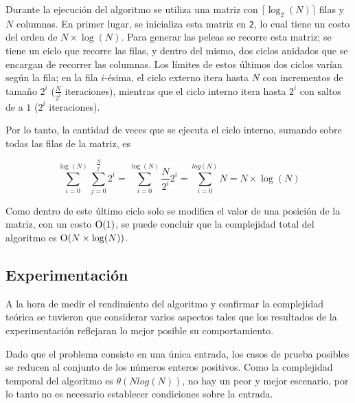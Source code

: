      Durante la ejecución del algoritmo se utiliza una matriz con $\lceil \log_2(N) \rceil$ filas y $N$ columnas. En primer lugar, se inicializa esta matriz en \texttt{2}, lo cual tiene un costo del orden de $N \times \log(N)$. Para generar las peleas se recorre esta matriz; se tiene un ciclo que recorre las filas, y dentro del mismo, dos ciclos anidados que se encargan de recorrer las columnas. Los límites de estos últimos dos ciclos varían según la fila; en la fila $i$-ésima, el ciclo externo itera hasta $N$ con incrementos de tamaño $2^i$ ($\frac{N}{2^i}$ iteraciones), mientras que el ciclo interno itera hasta $2^i$ con saltos de a $1$ ($2^i$ iteraciones).

      Por lo tanto, la cantidad de veces que se ejecuta el ciclo interno, sumando sobre todas las filas de la matriz, es

      \[\sum_{i = 0}^{\log(N)} \sum_{j = 0}^{\frac{N}{2^i}} 2^i = \sum_{i = 0}^{\log(N)} \frac{N}{2^i} 2^i = \sum_{i = 0}^{log(N)} N = N \times \log(N)\]

      Como dentro de este último ciclo solo se modifica el valor de una posición de la matriz, con un costo $\operatorname{O}(1)$, se puede concluir que la complejidad total del algoritmo es $\operatorname{O}(N \times \log(N))$. 



    \subsection{Experimentación}

	A la hora de medir el rendimiento del algoritmo y confirmar la complejidad
	teórica se tuvieron que considerar varios aspectos tales que los
	resultados de la experimentación reflejaran lo mejor posible su
	comportamiento.

	Dado que el problema consiste en una única entrada, los casos de prueba
	posibles se reducen al conjunto de los números enteros positivos. Como la
	complejidad temporal del algoritmo es $\theta(Nlog(N))$, no hay un peor
	y mejor escenario, por lo tanto no es necesario establecer condiciones sobre
	la entrada.

